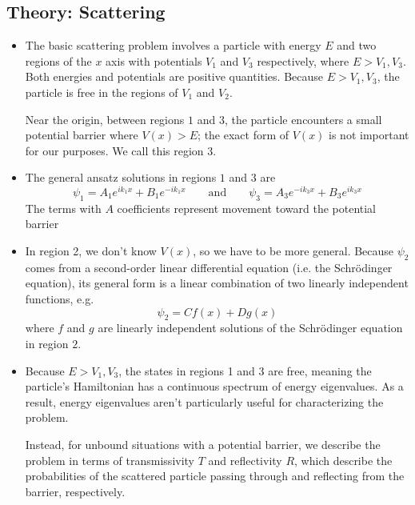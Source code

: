 \documentclass[11pt, a4paper]{article}
\newcommand{\eqtext}[1]{\qquad \text{#1} \qquad}
\newcommand{\Schro}{Schr\"{o}dinger\xspace}
\begin{document}
\subsection{Theory: Scattering}
\begin{itemize}
	\item The basic scattering problem involves a particle with energy $ E $ and two regions of the $ x $ axis with potentials $ V_{1} $ and $ V_{3} $ respectively,  where $ E > V_{1}, V_{3} $. Both energies and potentials are positive quantities. Because $ E > V_{1}, V_{3} $, the particle is free in the regions of $ V_{1} $ and $ V_{2} $.
	
	Near the origin, between regions $ 1 $ and $ 3 $, the particle encounters a small potential barrier where $ V(x) > E $; the exact form of $ V(x) $ is not important for our purposes. We call this region $ 3 $. 
	
	\item The general ansatz solutions in regions $ 1 $ and $ 3 $ are
	\begin{equation*}
		\psi_{1} = A_{1} e^{ik_{1}x} + B_{1}e^{-ik_{1}x} \eqtext{and} \psi_{3} = A_{3} e^{-ik_{3}x} + B_{3}e^{ik_{3}x}
	\end{equation*}
	The terms with $ A $ coefficients represent movement toward the potential barrier 
	
	\item In region 2, we don't know $ V(x) $, so we have to be more general. Because $ \psi_{2} $ comes from a second-order linear differential equation (i.e. the \Schro equation), its general form is a linear combination of two linearly independent functions, e.g.
	\begin{equation*}
		\psi_{2} = C f(x) + D g(x)
	\end{equation*}
	where $ f $ and $ g $ are linearly independent solutions of the \Schro equation in region $ 2 $. 
	
	\item Because $ E > V_{1}, V_{3} $, the states in regions 1 and 3 are free, meaning the particle's Hamiltonian has a continuous spectrum of energy eigenvalues. As a result, energy eigenvalues aren't particularly useful for characterizing the problem. 
	
	Instead, for unbound situations with a potential barrier, we describe the problem in terms of transmissivity $ T $ and reflectivity $ R $, which describe the probabilities of the scattered particle passing through and reflecting from the barrier, respectively.
\end{itemize}
\end{document}
